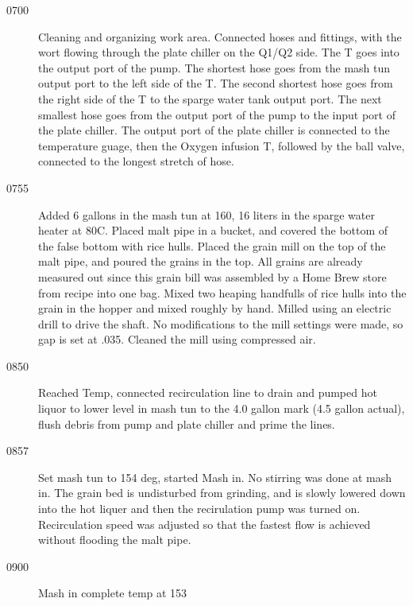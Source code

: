 \def\todaysdate{20210717}
\newday{\todaysdate}\label{\todaysdate}


\begin{description}
    \item[0700] Cleaning and organizing work area.  Connected hoses and fittings, with the wort flowing through the plate chiller on the Q1/Q2 side.  The T goes into the output port of the pump.  The shortest hose goes from the mash tun output port to the left side of the T.  The second shortest hose goes from the right side of the T to the sparge water tank output port.  The next smallest hose goes from the output port of the pump to the input port of the plate chiller.  The output port of the plate chiller is connected to the temperature guage, then the Oxygen infusion T, followed by the ball valve, connected to the longest stretch of hose.
    \item[0755] Added 6 gallons in the mash tun at 160, 16 liters in the sparge water heater at 80C.  Placed malt pipe in a bucket, and covered the bottom of the false bottom with rice hulls.  Placed the grain mill on the top of the malt pipe, and poured the grains in the top.  All grains are already measured out since this grain bill was assembled by a Home Brew store from recipe into one bag.  Mixed two heaping handfulls of rice hulls into the grain in the hopper and mixed roughly by hand.  Milled using an electric drill to drive the shaft.  No modifications to the mill settings were made, so gap is set at .035.  Cleaned the mill using compressed air.
    \item[0850] Reached Temp, connected recirculation line to drain and pumped hot liquor to lower level in mash tun to the 4.0 gallon mark (4.5 gallon actual), flush debris from pump and plate chiller and prime the lines.
    \item[0857] Set mash tun to 154 deg, started Mash in. No stirring was done at mash in.  The grain bed is undisturbed from grinding, and is slowly lowered down into the hot liquer and then the recirulation pump was turned on.  Recirculation speed was adjusted so that the fastest flow is achieved without flooding the malt pipe.
    \item[0900] Mash in complete temp at 153

\end{description}
